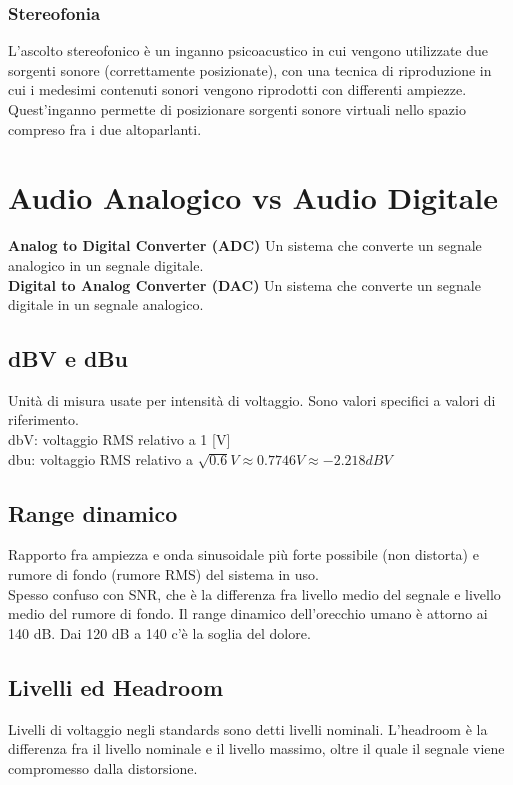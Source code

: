 \documentclass[8pt,a4paper]{article}
\begin{document}
\begin{multicols}{5}
    \subsubsection{Stereofonia}
    L’ascolto stereofonico è un inganno psicoacustico in cui vengono utilizzate due
    sorgenti sonore (correttamente posizionate), con una tecnica di riproduzione in
    cui i medesimi contenuti sonori vengono riprodotti con differenti ampiezze.
    Quest’inganno permette di posizionare sorgenti sonore virtuali nello spazio
    compreso fra i due altoparlanti.


    \section{Audio Analogico vs Audio Digitale}
    \textbf{Analog to Digital Converter (ADC)} Un sistema che converte un segnale 
    analogico in un segnale digitale. \\
    \textbf{Digital to Analog Converter (DAC)} Un sistema che converte un segnale 
    digitale in un segnale analogico.

    \subsection{dBV e dBu}
    Unità di misura usate per intensità di voltaggio.
    Sono valori specifici a valori di riferimento. \\
    dbV: voltaggio RMS relativo a 1 [V]\\
    dbu: voltaggio RMS relativo a $\sqrt{0.6} V \approx 0.7746 V \approx -2.218 dBV$

    \subsection{Range dinamico}
    Rapporto fra ampiezza e onda sinusoidale più forte possibile (non distorta)
    e rumore di fondo (rumore RMS) del sistema in uso. \\
    Spesso confuso con SNR, che è la differenza fra livello medio del segnale
    e livello medio del rumore di fondo. Il range dinamico dell'orecchio umano
    è attorno ai 140 dB. Dai 120 dB a 140 c'è la soglia del dolore.

    \subsection{Livelli ed Headroom}
    Livelli di voltaggio negli standards sono detti livelli nominali.
    L'headroom è la differenza fra il livello nominale e il livello massimo,
    oltre il quale il segnale viene compromesso dalla distorsione.


\end{multicols}
\end{document}
